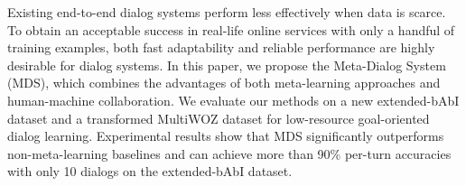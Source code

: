 Existing end-to-end dialog systems perform less effectively when data is scarce. To obtain an acceptable success in real-life online services with only a handful of training examples, both fast adaptability and reliable performance are highly desirable for dialog systems. In this paper, we propose the Meta-Dialog System (MDS), which combines the advantages of both meta-learning approaches and human-machine collaboration. We evaluate our methods on a new extended-bAbI dataset and a transformed MultiWOZ dataset for low-resource goal-oriented dialog learning. Experimental results show that MDS significantly outperforms non-meta-learning baselines and can achieve more than 90\% per-turn accuracies with only 10 dialogs on the extended-bAbI dataset.
